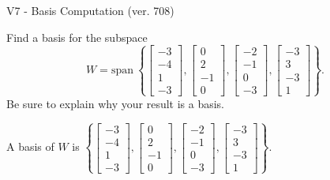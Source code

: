 \begin{exercise}
  \begin{exerciseTitle}V7 - Basis Computation (ver. 708)\end{exerciseTitle}
  \begin{exerciseStatement}
    Find a basis for the subspace 
\[W=\mathrm{span}\ \left\{\left[\begin{array}{r}
-3 \\
-4 \\
1 \\
-3
\end{array}\right] , \left[\begin{array}{r}
0 \\
2 \\
-1 \\
0
\end{array}\right] , \left[\begin{array}{r}
-2 \\
-1 \\
0 \\
-3
\end{array}\right] , \left[\begin{array}{r}
-3 \\
3 \\
-3 \\
1
\end{array}\right]\right\}.\]
 Be sure to explain why your result is a basis.


  \end{exerciseStatement}
  \begin{exerciseAnswer}
   A basis of \(W\) is  \(\left\{\left[\begin{array}{r}
-3 \\
-4 \\
1 \\
-3
\end{array}\right] , \left[\begin{array}{r}
0 \\
2 \\
-1 \\
0
\end{array}\right] , \left[\begin{array}{r}
-2 \\
-1 \\
0 \\
-3
\end{array}\right] , \left[\begin{array}{r}
-3 \\
3 \\
-3 \\
1
\end{array}\right]\right\}\).
  


  \end{exerciseAnswer}
\end{exercise}